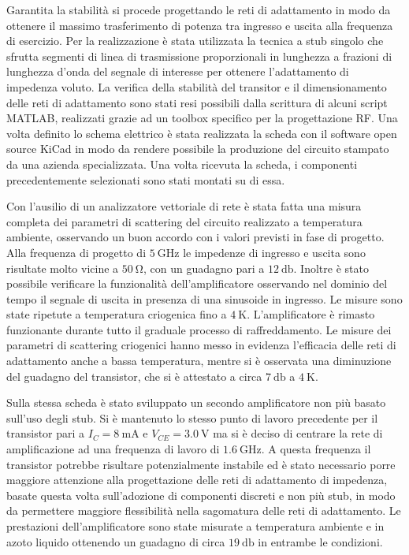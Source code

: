 \documentclass[12pt]{article}
\begin{document}
Garantita la stabilità si procede progettando le reti di adattamento in modo da ottenere il massimo trasferimento di potenza tra ingresso e uscita alla frequenza di esercizio. Per la realizzazione è stata utilizzata la tecnica a stub singolo che sfrutta segmenti di linea di trasmissione proporzionali in lunghezza a frazioni di lunghezza d'onda del segnale di interesse per ottenere l'adattamento di impedenza voluto. La verifica della stabilità del transitor e il dimensionamento delle reti di adattamento sono stati resi possibili dalla scrittura di alcuni script MATLAB, realizzati grazie ad un toolbox specifico per la progettazione RF.
Una volta definito lo schema elettrico è stata realizzata la scheda con il software open source KiCad in modo da rendere possibile la produzione del circuito stampato da una azienda specializzata. Una volta ricevuta la scheda, i componenti precedentemente selezionati sono stati montati su di essa.

Con l'ausilio di un analizzatore vettoriale di rete è stata fatta una misura completa dei parametri di scattering del circuito realizzato a temperatura ambiente, osservando un buon accordo con i valori previsti in fase di progetto. Alla frequenza di progetto di $\SI{5}{\giga\hertz}$ le impedenze di ingresso e uscita sono risultate molto vicine a $\SI{50}{\ohm}$, con un guadagno pari a $\SI{12}{\decibel}$. Inoltre è stato possibile verificare la funzionalità dell'amplificatore osservando nel dominio del tempo il segnale di uscita in presenza di una sinusoide in ingresso. Le misure sono state ripetute a temperatura criogenica fino a $\SI{4}{\kelvin}$. L'amplificatore è rimasto funzionante  durante tutto il graduale processo di raffreddamento. Le misure dei parametri di scattering criogenici hanno messo in evidenza l'efficacia delle reti di adattamento anche a bassa temperatura, mentre si è osservata una diminuzione del guadagno del transistor, che si è attestato a circa $\SI{7}{\decibel}$ a $\SI{4}{\kelvin}$.

Sulla stessa scheda è stato sviluppato un secondo amplificatore non più basato sull'uso degli stub. Si è mantenuto lo stesso punto di lavoro precedente per il transistor pari a $I_{C}=\SI{8}{\milli\ampere}$ e $V_{CE}=\SI{3.0}{\volt}$ ma si è deciso di centrare la rete di amplificazione ad una frequenza di lavoro di $\SI{1.6}{\giga\hertz}$. A questa frequenza il transistor potrebbe risultare potenzialmente instabile ed è stato necessario porre maggiore attenzione alla progettazione delle reti di adattamento di impedenza, basate questa volta sull'adozione di componenti discreti e non più stub, in modo da permettere maggiore flessibilità nella sagomatura delle reti di adattamento. Le prestazioni dell'amplificatore sono state misurate a temperatura ambiente e in azoto liquido ottenendo un guadagno di circa $\SI{19}{\decibel}$ in entrambe le condizioni.
\end{document}
